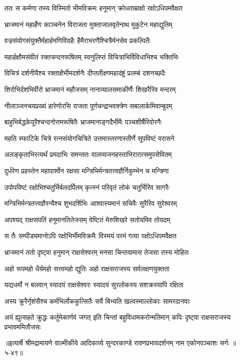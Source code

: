 
\twolineshloka
{ततः स कर्मणा तस्य विस्मितो भीमविक्रमः}
{हनूमान् क्रोधताम्राक्षो रक्षोऽधिपमवैक्षत} %

\twolineshloka
{भ्राजमानं महार्हेण काञ्चनेन विराजता}
{मुक्ताजालवृतेनाथ मुकुटेन महाद्युतिम्} %

\twolineshloka
{वज्रसंयोगसंयुक्तैर्महार्हमणिविग्रहैः}
{हैमैराभरणैश्चित्रैर्मनसेव प्रकल्पितैः} %

\twolineshloka
{महार्हक्षौमसंवीतं रक्तचन्दनरूषितम्}
{स्वनुलिप्तं विचित्राभिर्विविधाभिश्च भक्तिभिः} %

\twolineshloka
{विचित्रं दर्शनीयैश्च रक्ताक्षैर्भीमदर्शनैः}
{दीप्ततीक्ष्णमहादंष्ट्रं प्रलम्बं दशनच्छदैः} %

\twolineshloka
{शिरोभिर्दशभिर्वीरो भ्राजमानं महौजसम्}
{नानाव्यालसमाकीर्णैः शिखरैरिव मन्दरम्} %

\twolineshloka
{नीलाञ्जनचयप्रख्यं हारेणोरसि राजता}
{पूर्णचन्द्राभवक्त्रेण सबालार्कमिवाम्बुदम्} %

\twolineshloka
{बाहुभिर्बद्धकेयूरैश्चन्दनोत्तमरूषितैः}
{भ्राजमानाङ्गदैर्भीमैः पञ्चशीर्षैरिवोरगैः} %

\twolineshloka
{महति स्फाटिके चित्रे रत्नसंयोगचित्रिते}
{उत्तमास्तरणास्तीर्णे सूपविष्टं वरासने} %

\twolineshloka
{अलङ्कृताभिरत्यर्थं प्रमदाभिः समन्ततः}
{वालव्यजनहस्ताभिरारात्समुपसेवितम्} %

\twolineshloka
{दुर्धरेण प्रहस्तेन महापार्श्वेन रक्षसा}
{मन्त्रिभिर्मन्त्रतत्त्वज्ञैर्निकुम्भेन च मन्त्रिणा} %

\twolineshloka
{उपोपविष्टं रक्षोभिश्चतुर्भिर्बलदर्पितम्}
{कृत्स्नं परिवृतं लोकं चतुर्भिरिव सागरैः} %

\twolineshloka
{मन्त्रिभिर्मन्त्रतत्त्वज्ञैरन्यैश्च शुभदर्शिभिः}
{आश्वास्यमानं सचिवैः सुरैरिव सुरेश्वरम्} %

\twolineshloka
{अपश्यद् राक्षसपतिं हनूमानतितेजसम्}
{वेष्टितं मेरुशिखरे सतोयमिव तोयदम्} %

\twolineshloka
{स तैः सम्पीड्यमानोऽपि रक्षोभिर्भीमविक्रमैः}
{विस्मयं परमं गत्वा रक्षोऽधिपमवैक्षत} %

\twolineshloka
{भ्राजमानं ततो दृष्ट्वा हनुमान् राक्षसेश्वरम्}
{मनसा चिन्तयामास तेजसा तस्य मोहितः} %

\twolineshloka
{अहो रूपमहो धैर्यमहो सत्त्वमहो द्युतिः}
{अहो राक्षसराजस्य सर्वलक्षणयुक्तता} %

\twolineshloka
{यद्यधर्मो न बलवान् स्यादयं राक्षसेश्वरः}
{स्यादयं सुरलोकस्य सशक्रस्यापि रक्षिता} %

\twolineshloka
{अस्य क्रूरैर्नृशंसैश्च कर्मभिर्लोककुत्सितैः}
{सर्वे बिभ्यति खल्वस्माल्लोकाः सामरदानवाः} %

\threelineshloka
{अयं ह्युत्सहते क्रुद्धः कर्तुमेकार्णवं जगत्}
{इति चिन्तां बहुविधामकरोन्मतिमान् कपिः}
{दृष्ट्वा राक्षसराजस्य प्रभावममितौजसः} %


॥इत्यार्षे श्रीमद्रामायणे वाल्मीकीये आदिकाव्ये सुन्दरकाण्डे रावणप्रभावदर्शनम् नाम एकोनपञ्चाशः सर्गः ॥५-४९॥
